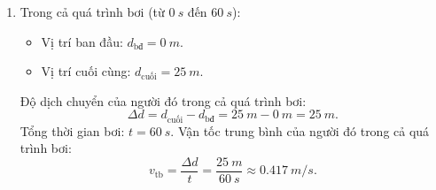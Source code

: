 \begin{ex}
{\begin{enumerate}[label=\alph*)]
			\begin{itemize}
				\item Tại $t=\SI{40}{s}$, $d_1 = \SI{45}{m}$.
				\item Tại $t=\SI{60}{s}$, $d_2 = \SI{25}{m}$.
			\end{itemize}
			Trong 20 giây cuối, độ dịch chuyển thay đổi là $\Delta d = d_2 - d_1 = \SI{25}{m} - \SI{45}{m} = \SI{-20}{m}.$
			Quãng đường đi được trong 20 giây cuối: $s = |\Delta d| = |\SI{-20}{m}| = \SI{20}{m}.$
			Mỗi giây người đó bơi được (tốc độ):
			$$\dfrac{\SI{20}{m}}{\SI{20}{s}} = \SI{1}{m/s}.$$
			Vận tốc của người đó trong 20 giây cuối là:
			$$v = \dfrac{\Delta d}{\Delta t} = \dfrac{\SI{25}{m} - \SI{45}{m}}{\SI{60}{s} - \SI{40}{s}} = \dfrac{\SI{-20}{m}}{\SI{20}{s}} = \SI{-1}{m/s}.$$
			\item Trong cả quá trình bơi (từ $\SI{0}{s}$ đến $\SI{60}{s}$):
			\begin{itemize}
				\item Vị trí ban đầu: $d_{\text{bđ}} = \SI{0}{m}$.
				\item Vị trí cuối cùng: $d_{\text{cuối}} = \SI{25}{m}$.
			\end{itemize}
			Độ dịch chuyển của người đó trong cả quá trình bơi:
			$$\Delta d = d_{\text{cuối}} - d_{\text{bđ}} = \SI{25}{m} - \SI{0}{m} = \SI{25}{m}.$$
			Tổng thời gian bơi: $t = \SI{60}{s}$.
			Vận tốc trung bình của người đó trong cả quá trình bơi:
			$$v_{\text{tb}} = \dfrac{\Delta d}{t} = \dfrac{\SI{25}{m}}{\SI{60}{s}} \approx \SI{0.417}{m/s}.$$
		\end{enumerate}
	}
\end{ex}


